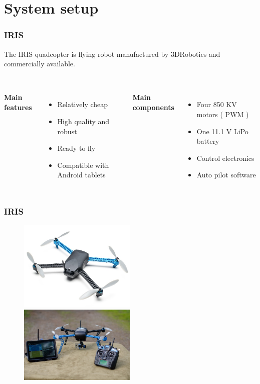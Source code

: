 \documentclass[xcolor=dvipsnames]{beamer}
\begin{document}

\section{System setup}
\begin{frame}
\tableofcontents[sectionstyle=show,square,currentsection]
\end{frame}


\begin{frame}
\frametitle{IRIS}
The IRIS quadcopter is flying robot manufactured by 3DRobotics and commercially available. \\~\\ 

	\begin{columns}[t]
		\textbf{Main features}
		\begin{itemize}
			\item Relatively cheap
			\item High quality and robust 
			\item Ready to fly
			\item Compatible with Android tablets
		\end{itemize}
		\textbf{Main components}
		\begin{itemize}
			\item Four 850 KV motors ( PWM )
			\item One 11.1 V LiPo battery
			\item Control electronics
			\item Auto pilot software
		\end{itemize}
	\end{columns}
\end{frame}
\begin{frame}
\frametitle{IRIS}
\begin{figure}
\centering
\includegraphics[width = 0.5\textwidth]{f/iris.jpg}
\includegraphics[width = 0.5\textwidth]{f/iris_planner.jpg}

\end{figure}

\end{frame}
\end{document}
